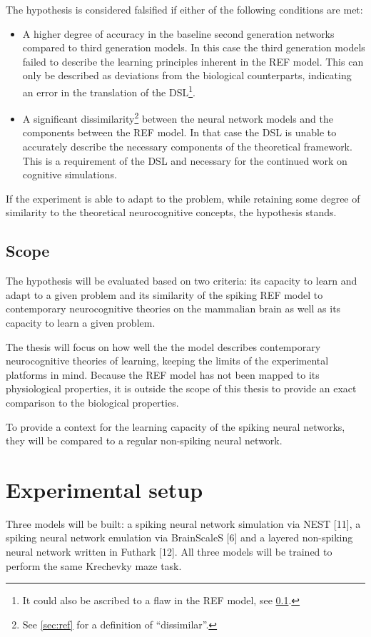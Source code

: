 \documentclass[report.tex]{subfiles}
\begin{document}
The hypothesis is considered falsified if either of the following 
conditions are met: 
\begin{itemize}
  \item A higher degree of accuracy in the baseline second generation
    networks compared to third generation models.
    In this case the third generation models failed to describe the
    learning principles inherent in the \gls{REF} model.
    This can only be described as deviations from the biological
    counterparts, indicating an error in the translation of the
    \gls{DSL}\footnote{It could also be ascribed to a flaw in the 
    \gls{REF} model, see \ref{sec:scope}.}.
  \item A significant dissimilarity\footnote{See \ref{sec:ref} for 
    a definition of \enquote{dissimilar}.} between the neural network models
    and the components between the \gls{REF} model. 
    In that case the \gls{DSL} is unable to accurately describe the
    necessary components of the theoretical framework.
    This is a requirement of the \gls{DSL} and necessary for the 
    continued work on cognitive simulations.
\end{itemize}

If the experiment is able to adapt to the problem, while retaining some
degree of similarity to the theoretical neurocognitive concepts, 
the hypothesis stands.

\subsection{Scope} \label{sec:scope}
The hypothesis will be evaluated based on two criteria: its 
capacity to learn and adapt to a given problem and its similarity of
the spiking REF model to contemporary neurocognitive theories on the
mammalian brain as well as its capacity to learn a given problem.

The thesis will focus on how well the the model describes contemporary
neurocognitive theories of learning, keeping the limits of the
experimental platforms in mind.
Because the REF model has not been mapped to its physiological
properties, it is outside the scope of this thesis to provide an exact
comparison to the biological properties.

To provide a context for the learning capacity of the spiking neural networks, they will be compared to a regular non-spiking neural network.

\section{Experimental setup}
Three models will be built: a spiking neural network simulation via NEST [11], a spiking neural network emulation via BrainScaleS [6] and a layered non-spiking neural network written in Futhark [12].
All three models will be trained to perform the same Krechevky maze task.
\end{document}
